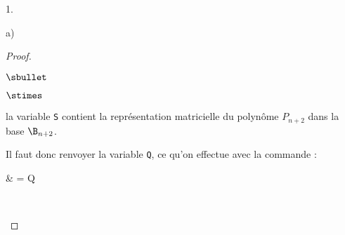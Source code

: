 \documentclass[11pt]{article}%
\begin{document}
\begin{exerciceAP}
\begin{noliste}{1.}
\begin{noliste}{a)}
\begin{proof}
\begin{noliste}{$\sbullet$}
\begin{noliste}{$\stimes$}
            \item la variable {\tt S} contient la représentation
              matricielle du polynôme $P_{n+2}$ dans la base $\B_{n+2}$.
            \end{noliste}
            Il faut donc renvoyer la variable {\tt Q}, ce qu'on
            effectue avec la commande :
            \begin{scilabC}{9}
              &  = Q
            \end{scilabC}~\\[-1.4cm]
        \end{noliste}
      \end{proof}
    \end{noliste}
  \end{noliste}
\end{exerciceAP}
\end{document}
